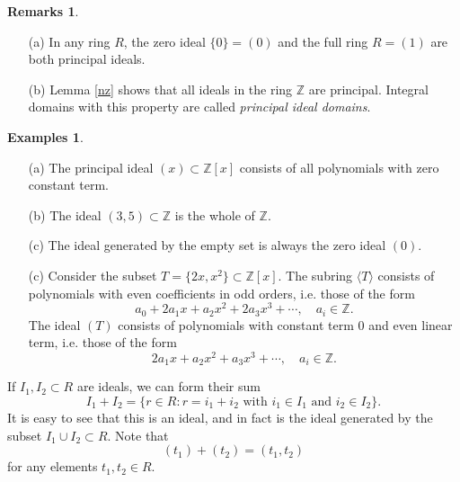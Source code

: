 \documentclass [12pt,oneside,a4paper,mathscr]{amsart}
\theoremstyle{definition}
\newtheorem{remarks}[thm]{Remarks}
\newtheorem{example}[thm]{Example}
\newtheorem{examples}[thm]{Examples}
\newcommand{\Z}{\mathbb Z}
\begin{document}
\begin{remarks}
\begin{itemize}
\item[(a)]
In any ring $R$, the zero ideal $\{0\}=(0)$ and the full ring $R=(1)$ are both principal ideals.\smallskip
\item[(b)]
Lemma \ref{nz} shows  that all ideals in the ring $\Z$ are principal. Integral domains with this property are called \emph{principal ideal domains}.\end{itemize}
\end{remarks}



\begin{examples}
\begin{itemize}
\item[(a)]
The principal  ideal $(x)\subset \Z[x]$ consists of all polynomials with zero constant term.\smallskip
 

\item[(b)] The ideal $(3,5)\subset\Z$  is the whole of $\Z$. \smallskip

\item[(c)] The ideal generated by the empty set is always the zero ideal $(0)$.\smallskip

\item[(c)]Consider the subset $T=\{2x, x^2\}\subset \Z[x]$. The subring $\langle T\rangle$ consists of  polynomials with even coefficients in odd orders, i.e. those of the form
\[a_0+2a_1 x + a_2 x^2 + 2a_3 x^3 + \cdots , \quad a_i\in \Z.\]
The ideal $(T)$ consists of polynomials with constant term 0 and even linear term, i.e. those of the form
\[2a_1 x + a_2 x^2 + a_3 x^3 +\cdots, \quad a_i\in \Z.\]
\end{itemize}
\end{examples}








If $I_1,I_2\subset R$ are ideals, we can form their sum
\[I_1+I_2 = \{r\in R: r = i_1+ i_2 \text{ with } i_1\in I_1\text{ and } i_2\in I_2\}.\]
It is easy to see that this is an ideal, and in fact is
the ideal generated by the subset $I_1\cup I_2 \subset R$.
Note that
\[(t_1)+(t_2)=(t_1,t_2)\]
for any elements $t_1,t_2\in R$.

\end{document}
